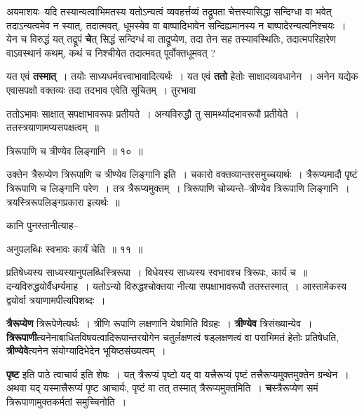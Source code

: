 \documentclass[article,12pt,a4paper]{memoir}
\begin{document}
	  \pstart अयमाशयः--यदि तस्यान्यत्वाभिमतस्य यतोऽन्यत्वं व्यवहर्त्तव्यं तद्रूपता चेत्तस्यासिद्धा सन्दिग्धा वा भवेत् तदाऽन्यत्वमेव न स्यात्, तदात्मवत्, धूमस्येव वा बाष्पादिभावेन सन्दिह्यमानस्य न बाष्पादेरन्यत्वनिश्चयः । येन च विरुद्धं यत् तद्रूपं \textbf{चे}त् सिद्धं सन्दिग्धं वा ताद्रूप्येण, तदा तेन सह तस्यावस्थितिः, तदात्मपरिहारेण वाऽवस्थानं कथम्, कथं च निश्चीयेत तदात्मवत् पूर्वोक्तधूमवत् ?
	\pend
      

	  \pstart यत एवं \textbf{तस्मात्} । तयोः साध्यधर्मवत्त्वाभावादित्यर्थः । यत एवं \textbf{ततो} हेतोः साक्षादव्यवधानेन । अनेन यद्येक एवासपक्षो वक्तव्यः तदा तदभाव एवेति सूचितम् । तुरभावा  \leavevmode{} 
	  
	ततोऽभावः साक्षात् सपक्षाभावरूपः प्रतीयते । अन्यविरुद्धौ तु सामर्थ्यादभावरूपौ प्रतीयेते । ततस्त्रयाणामप्यसपक्षत्वम् ॥  
	  
	त्रिरूपाणि च त्रीण्येव लिङ्गानि ॥ १० ॥ 
	  
	उक्तेन त्रैरूप्येण त्रिरूपाणि च त्रीण्येव लिङ्गानि इति । चकारो वक्तव्यान्तरसमुच्चयार्थः । त्रैरूप्यमादौ पृष्टं त्रिरूपाणि च लिङ्गानि परेण । तत्र त्रैरूप्यमुक्तम् । त्रिरूपाणि चोच्यन्ते--त्रीण्येव त्रिरूपाणि लिङ्गानि । त्रयस्त्रिरूपलिङ्गप्रकारा इत्यर्थः ॥  
	  
	कानि पुनस्तानीत्याह--  
	  
	अनुपलब्धिः स्वभावः कार्यं चेति ॥ ११ ॥ 
	  
	प्रतिषेध्यस्य साध्यस्यानुपलब्धिस्त्रिरूपा । विधेयस्य साध्यस्य स्वभावश्च त्रिरूपः, कार्य च ॥ दन्यविरुद्धयोर्वैधर्म्यमाह । यतोऽन्यो विरुद्धश्चोक्तया नीत्या सपक्षाभावरूपौ ततस्तस्मात् । आस्तामेकस्य द्वयोर्वा त्रयाणामपीत्यपिशब्दः ।
	\pend
      

	  \pstart \textbf{त्रैरूप्येण} त्रिरूपेणेत्यर्थः । त्रीणि रूपाणि लक्षणानि येषामिति विग्रहः । \textbf{त्रीण्येव} त्रिसंख्यान्येव । \textbf{त्रिरूपाणी}त्यनेनाबाधितविषयत्वादिरूपान्तरयोगेन चतुर्लक्षणत्वं षड्लक्षणत्वं वा पराभिमतं हेतोः प्रतिषेधति, \textbf{त्रीण्येवे}त्यनेन संयोग्यादिभेदेन भूयिष्ठसंख्यत्वम् ।
	\pend
      

	  \pstart \textbf{पृष्ट} इति पाठे त्वाचार्य इति शेषः । यत् त्रैरूप्यं पृष्टो यद् वा यत्त्रैरूप्यं पृष्टं तत्त्रैरूप्यमुक्तमुक्तेन ग्रन्थेन । अथवा यद् यस्मात्त्रैरूप्यं पृष्ट आचार्यः, पृष्टं वा तत् तस्मात् त्रैरूप्यमुक्तमिति । \textbf{च}स्त्रैरूप्येण समं त्रिरूपाणामुक्तकर्मतां समुच्चिनोति ।
	\pend
      
\end{document}
